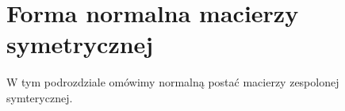 \section{Forma normalna macierzy symetrycznej}

W tym podrozdziale omówimy normalną postać macierzy zespolonej symterycznej.
